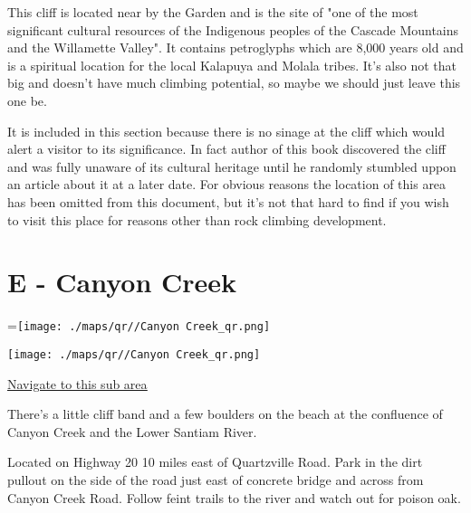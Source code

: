 \begin{multicols}{2}
This cliff is located near by the Garden and is the site of "one of the most significant cultural resources of the Indigenous peoples of the Cascade Mountains and the Willamette Valley". It contains petroglyphs which are 8,000 years old and is a spiritual location for the local Kalapuya and Molala tribes. It's also not that big and doesn't have much climbing potential, so maybe we should just leave this one be. 

It is included in this section because there is no sinage at the cliff which would alert a visitor to its significance. In fact author of this book discovered the cliff and was fully unaware of its cultural heritage until he randomly stumbled uppon an article about it at a later date. For obvious reasons the location of this area has been omitted from this document, but it's not that hard to find if you wish to visit this place for reasons other than rock climbing development.\\




\vfill\null
\columnbreak

\section{E - Canyon Creek}\label{sa:Canyon Creek}
=\hbox{\texttt{[image: ./maps/qr//Canyon Creek\_qr.png]}}%
\begin{center}
\texttt{[image: ./maps/qr//Canyon Creek\_qr.png]}
\end{center}
\begin{center}
\underline{\textcolor{blue}{\href{http://maps.google.com/maps?q=44.39708529718213,-122.44671253776127}{Navigate to this sub area}}}
\end{center}


There's a little cliff band and a few boulders on the beach at the confluence of Canyon Creek and the Lower Santiam River.

Located on Highway 20 10 miles east of Quartzville Road. Park in the dirt pullout on the side of the road just east of concrete bridge and across from Canyon Creek Road. Follow feint trails to the river and watch out for poison oak.\\




\vfill\null
\columnbreak


\end{multicols}
